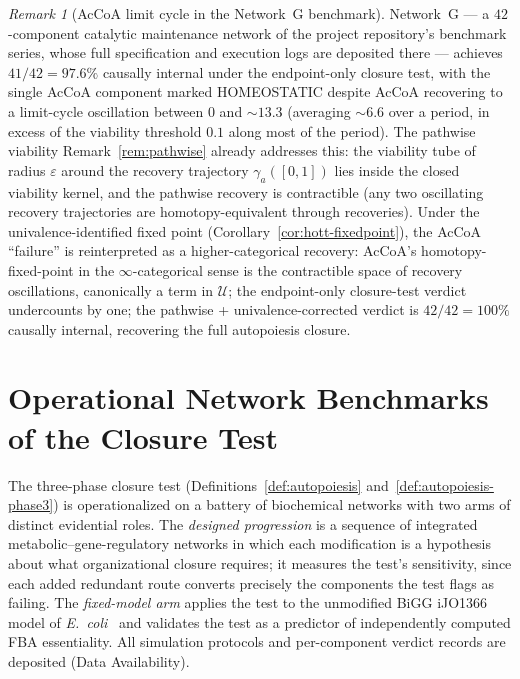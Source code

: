 \documentclass[11pt,a4paper]{article}
\theoremstyle{plain}
\theoremstyle{definition}
\theoremstyle{remark}
\newtheorem{remark}[theorem]{Remark}
\begin{document}
\begin{remark}[AcCoA limit cycle in the Network~G benchmark]
\label{rem:netG-accola-cycle}
Network~G --- a $42$-component catalytic maintenance network of the
project repository's benchmark series, whose full specification and
execution logs are deposited there --- achieves $41/42 = 97.6\%$
causally internal under the endpoint-only closure test, with the single
AcCoA component marked HOMEOSTATIC despite AcCoA recovering to a
limit-cycle oscillation between $0$ and $\sim 13.3$ (averaging $\sim
6.6$ over a period, in excess of the viability threshold $0.1$ along
most of the period). The pathwise viability Remark~\ref{rem:pathwise}
already addresses this: the viability tube of radius $\varepsilon$
around the recovery trajectory $\gamma_a([0,1])$ lies inside the closed
viability kernel, and the pathwise recovery is contractible (any two
oscillating recovery trajectories are homotopy-equivalent through
recoveries). Under the univalence-identified fixed point
(Corollary~\ref{cor:hott-fixedpoint}), the AcCoA ``failure'' is
reinterpreted as a higher-categorical recovery: AcCoA's
homotopy-fixed-point in the $\infty$-categorical sense is the
contractible space of recovery oscillations, canonically a term in
$\mathcal{U}$; the endpoint-only closure-test verdict undercounts by
one; the pathwise + univalence-corrected verdict is $42/42 = 100\%$
causally internal, recovering the full autopoiesis closure.
\end{remark}




\section{Operational Network Benchmarks of the Closure Test}
\label{sec:network-battery}

The three-phase closure test (Definitions~\ref{def:autopoiesis}
and~\ref{def:autopoiesis-phase3}) is operationalized on a battery
of biochemical networks with two arms of distinct evidential roles.
The \emph{designed progression} is a sequence of integrated
metabolic--gene-regulatory networks in which each modification is
a hypothesis about what organizational closure requires; it
measures the test's sensitivity, since each added redundant route
converts precisely the components the test flags as failing. The
\emph{fixed-model arm} applies the test to the unmodified BiGG
iJO1366 model of \emph{E.~coli}~\cite{orth2011} and validates the
test as a predictor of independently computed FBA essentiality.
All simulation protocols and per-component verdict records are
deposited (Data Availability).
\end{document}
